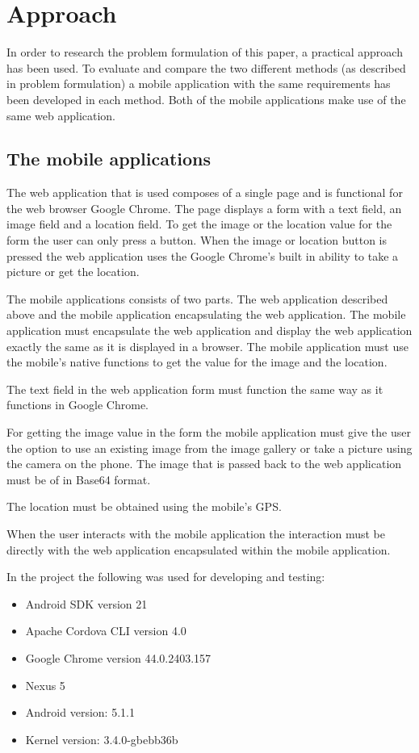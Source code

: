 \chapter{Approach}
In order to research the problem formulation of this paper, a practical approach has been used. To evaluate and compare the two different methods (as described in problem formulation) a mobile application with the same requirements has been developed in each method. Both of the mobile applications make use of the same web application. 
  
\section{The mobile applications}
The web application that is used composes of a single page and is functional for the web browser Google Chrome. The page displays a form with a text field, an image field and a location field. To get the image or the location value for the form the user can only press a button. When the image or location button is pressed the web application uses the Google Chrome’s built in ability to take a picture or get the location.

The mobile applications consists of two parts. The web application described above and the mobile application encapsulating the web application. The mobile application must encapsulate the web application and display the web application exactly the same as it is displayed in a browser. The mobile application must use the mobile’s native functions to get the value for the image and the location.

The text field  in the web application form must function the same way as it functions in Google Chrome. 

For getting the image value in the form the mobile application must give the user the option to use an existing image from the image gallery or take a picture using the camera on the phone. The image that is passed back to the web application must be of in Base64 format. 

The location must be obtained using the mobile’s GPS. 

When the user interacts with the mobile application the interaction must be directly with the web application encapsulated within the mobile application. 

In the project the following was used for developing and testing:
\begin{itemize}
\item Android SDK version 21
\item Apache Cordova CLI version 4.0
\item Google Chrome version 44.0.2403.157
\item Nexus 5
\item Android version: 5.1.1
\item Kernel version: 3.4.0-gbebb36b
\end{itemize}

